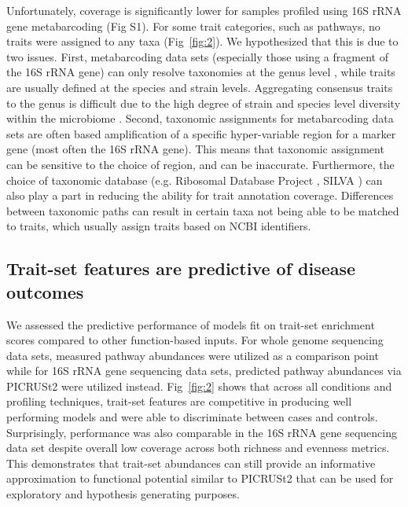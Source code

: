 \documentclass{bmcart}
\begin{document}
Unfortunately, coverage is significantly lower for samples profiled using 16S rRNA gene metabarcoding (Fig S1). For some trait categories, such as pathways, no traits were assigned to any taxa (Fig~\ref{fig:2}). We hypothesized that this is due to two issues. First, metabarcoding data sets (especially those using a fragment of the 16S rRNA gene) can only resolve taxonomies at the genus level \cite{johnson2019evaluation}, while traits are usually defined at the species and strain levels. Aggregating consensus traits to the genus is difficult due to the high degree of strain and species level diversity within the microbiome \cite{carrow2020strain}. Second, taxonomic assignments for metabarcoding data sets are often based amplification of a specific hyper-variable region for a marker gene (most often the 16S rRNA gene). This means that taxonomic assignment can be sensitive to the choice of region, and can be inaccurate. Furthermore, the choice of taxonomic database (e.g. Ribosomal Database Project \cite{cole2014ribosomal}, SILVA \cite{quast2013silva}) can also play a part in reducing the ability for trait annotation coverage. Differences between taxonomic paths \cite{balvociute2017silva} can result in certain taxa not being able to be matched to traits, which usually assign traits based on NCBI identifiers.  

\subsection*{Trait-set features are predictive of disease outcomes}

We assessed the predictive performance of models fit on trait-set enrichment scores compared to other function-based inputs. For whole genome sequencing data sets, measured pathway abundances were utilized as a comparison point while for 16S rRNA gene sequencing data sets, predicted pathway abundances via PICRUSt2 were utilized instead. Fig~\ref{fig:2} shows that across all conditions and profiling techniques, trait-set features are competitive in producing well performing models and were able to discriminate between cases and controls. Surprisingly, performance was also comparable in the 16S rRNA gene sequencing data set despite overall low coverage across both richness and evenness metrics. This demonstrates that trait-set abundances can still provide an informative approximation to functional potential similar to PICRUSt2 that can be used for exploratory and hypothesis generating purposes.   
\end{document}
